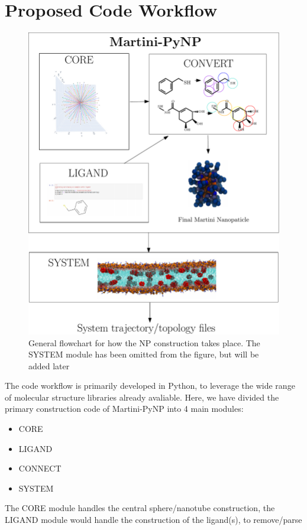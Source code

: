 \documentclass[12pt]{article}
\begin{document}
\section{Proposed Code Workflow}
\begin{figure} %
  \centering
  \includegraphics[scale=0.4]{schema.pdf}
  \caption{General flowchart for how the NP construction takes place. The SYSTEM module has been omitted from the figure, but will be added later}
\end{figure}
The code workflow is primarily developed in Python, to leverage the wide range of molecular structure libraries already avaliable. Here, we have divided the
primary construction code of Martini-PyNP into 4 main modules: 
\begin{itemize}
\item CORE
\item LIGAND
\item CONNECT
\item SYSTEM 
\end{itemize}
The CORE module handles the central sphere/nanotube construction, the LIGAND module would handle the construction of the ligand(s), to remove/parse
\end{document}
